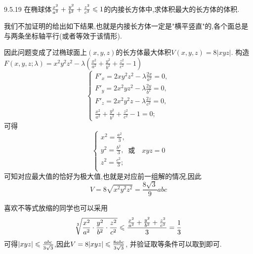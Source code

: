 \begin{exercise}{9.5.19}
    在椭球体$\frac{x^2}{a^2}+\frac{y^2}{b^2}+\frac{z^2}{c^2}\leqslant 1$的内接长方体中,求体积最大的长方体的体积.
\end{exercise}
\begin{solution}
    我们不加证明的给出如下结果,也就是内接长方体一定是"横平竖直"的,各个面总是与两条坐标轴平行(或者等效于该情形).

    因此问题变成了过椭球面上$(x,y,z)$的长方体最大体积$V(x,y,z)=8|xyz|$.
    构造$F(x,y,z;\lambda)=x^2y^2z^2-\lambda(\frac{x^2}{a^2}+\frac{y^2}{b^2}+\frac{z^2}{c^2}-1)$
    $$\begin{cases}
        F'_x=2xy^2z^2-\lambda\frac{2x}{a^2}=0,\\
        F'_y=2x^2yz^2-\lambda\frac{2y}{b^2}=0,\\
        F'_z=2x^2y^2z-\lambda\frac{2z}{c^2}=0,\\
        \frac{x^2}{a^2}+\frac{y^2}{b^2}+\frac{z^2}{c^2}-1=0;
    \end{cases}$$
    可得$$\begin{cases}
        x^2=\frac{a^2}{3},\\
        y^2=\frac{b^2}{3},\\
        z^2=\frac{c^2}{3};\\
    \end{cases}\text{或} \quad xyz=0$$
    可知对应最大值的恰好为极大值,也就是对应前一组解的情况,因此$$V=8\sqrt{x^2y^2z^2}=\frac{8\sqrt{3}}{9}abc$$


    喜欢不等式放缩的同学也可以采用$$\sqrt[3]{\frac{x^2}{a^2}\cdot\frac{y^2}{b^2}\cdot\frac{z^2}{c^2}}\leqslant \frac{\frac{x^2}{a^2}+\frac{y^2}{b^2}+\frac{z^2}{c^2}}{3}=\frac{1}{3}$$
    可得$|xyz|\leqslant \frac{abc}{3\sqrt{3}}$,因此$V=8|xyz|\leqslant \frac{8abc}{3\sqrt{3}}$,
    并验证取等条件可以取到即可.
\end{solution}

